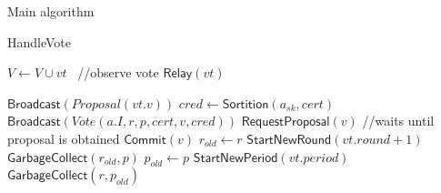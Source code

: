 \documentclass[10pt,a4paper]{article}
\begin{document}
\begin{section}{Main algorithm}
\begin{subsection}{HandleVote}
\begin{algorithm}[H]
\begin{algorithmic}[1]
            \State $V \gets V \cup vt$ \ //observe vote
            \State $\mathsf{Relay}(vt)$

                    \State $\mathsf{Broadcast}(Proposal(vt.v))$
                \EndIf
                        \State $cred \gets 
                        \mathsf{Sortition}(a_{sk}, cert)$
                            \State $\mathsf{Broadcast}(Vote(a.I, r, p, cert, v, cred))$
                        \EndIf
                    \EndFor
                \EndIf
                        \State $\mathsf{RequestProposal}(v)$ //waits until proposal is obtained
                    \EndIf
                    \State $\mathsf{Commit}(v)$  %
                    \State $r_{old} \gets r$
                    \State $\mathsf{StartNewRound}(vt.round+1)$
                    \State $\mathsf{GarbageCollect}(r_{old}, p)$
                \EndIf
                    \State $p_{old} \gets p$
                    \State $\mathsf{StartNewPeriod}(vt.period)$
                    \State $\mathsf{GarbageCollect}(r, p_{old})$
                \EndIf
            \EndIf

        \EndFunction
        \end{algorithmic}
        \caption{\underline{HandleVote}}
    \end{algorithm}
    

\end{subsection}
\end{section}
\end{document}
